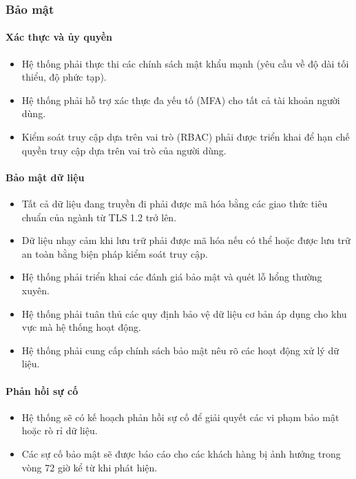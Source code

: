 \subsubsection{Bảo mật}

\paragraph{Xác thực và ủy quyền}
\begin{itemize}
    \item Hệ thống phải thực thi các chính sách mật khẩu mạnh (yêu cầu về độ dài tối thiểu, độ phức tạp).
    \item Hệ thống phải hỗ trợ xác thực đa yếu tố (MFA) cho tất cả tài khoản người dùng.
    \item Kiểm soát truy cập dựa trên vai trò (RBAC) phải được triển khai để hạn chế quyền truy cập dựa trên vai trò của người dùng.
\end{itemize}

\paragraph{Bảo mật dữ liệu}
\begin{itemize}
    \item Tất cả dữ liệu đang truyền đi phải được mã hóa bằng các giao thức tiêu chuẩn của ngành từ TLS 1.2 trở lên.
    \item Dữ liệu nhạy cảm khi lưu trữ phải được mã hóa nếu có thể hoặc được lưu trữ an toàn bằng biện pháp kiểm soát truy cập.
    \item Hệ thống phải triển khai các đánh giá bảo mật và quét lỗ hổng thường xuyên.
    \item Hệ thống phải tuân thủ các quy định bảo vệ dữ liệu cơ bản áp dụng cho khu vực mà hệ thống hoạt động.
    \item Hệ thống phải cung cấp chính sách bảo mật nêu rõ các hoạt động xử lý dữ liệu.
\end{itemize}

\paragraph{Phản hồi sự cố}
\begin{itemize}
    \item Hệ thống sẽ có kế hoạch phản hồi sự cố để giải quyết các vi phạm bảo mật hoặc rò rỉ dữ liệu.
    \item Các sự cố bảo mật sẽ được báo cáo cho các khách hàng bị ảnh hưởng trong vòng 72 giờ kể từ khi phát hiện.
\end{itemize}

